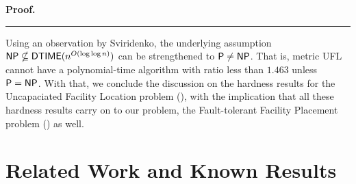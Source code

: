 \documentclass[oneside,final]{ucr}
\newenvironment{proof}[1][Proof]{\textbf{#1.} }{\ \rule{0.5em}{0.5em}}
\begin{document}
\begin{proof}
\end{proof}

Using an observation by Sviridenko, the underlying
assumption\\ ${\mbox{\sf NP}} \nsubseteq {\mbox{\sf DTIME}}(n^{O(\log\log n)})$ can
be strengthened to ${\mbox{\sf P}} \neq {\mbox{\sf NP}}$. That is, metric UFL
cannot have a polynomial-time algorithm with ratio less than
$1.463$ unless ${\mbox{\sf P}} = {\mbox{\sf NP}}$. With that, we conclude the
discussion on the hardness results for the Uncapaciated
Facility Location problem ({\UFL}), with the implication
that all these hardness results carry on to our problem, the
Fault-tolerant Facility Placement problem (\FTFP) as well.

\chapter{Related Work and Known Results} \label{ch: related_work}
\end{document}
